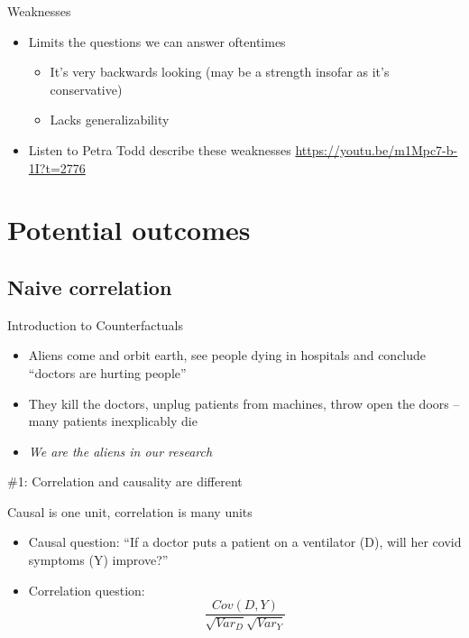 \documentclass{beamer}
\begin{document}
\begin{frame}{Weaknesses}

\begin{itemize}
\item Limits the questions we can answer oftentimes 
	\begin{itemize}
	\item It's very backwards looking (may be a strength insofar as it's conservative)
	\item Lacks generalizability
	\end{itemize}
\item Listen to Petra Todd describe these weaknesses \url{https://youtu.be/m1Mpc7-b-1I?t=2776}

\end{itemize}

\end{frame}


\section{Potential outcomes}

\subsection{Naive correlation}

\begin{frame}{Introduction to Counterfactuals}

  \begin{itemize}
    \item Aliens come and orbit earth, see people dying in hospitals and conclude ``doctors are hurting people''
    \item They kill the doctors, unplug patients from machines, throw open the doors -- many patients inexplicably die
    \item \emph{We are the aliens in our research}
  \end{itemize}

\end{frame}

\begin{frame}{\#1: Correlation and causality are different}

  Causal is one unit, correlation is many units
  \begin{itemize}
    \item Causal question: ``If a doctor puts a patient on a ventilator (D), will her covid symptoms (Y) improve?''
    \item Correlation question:  $$\frac{Cov(D,Y)}{\sqrt{Var_D}\sqrt{{Var_Y}}}$$
  \end{itemize}

\end{frame}
\end{document}
